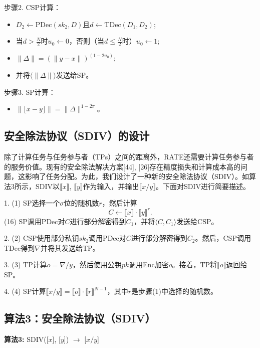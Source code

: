 步骤2. CSP计算：

\begin{itemize}[leftmargin=*, nosep]
  \item \(D_{2}\leftarrow\text{PDec}(sk_{2},D)\)且\(d\leftarrow\text{TDec}(D_{1},D_{2})\);
  \item 当\(d>\frac{N}{2}\)时\(u_{0}\gets 0\)，否则（当\(d\leq\frac{N}{2}\)时）\(u_{0}\gets 1\);
  \item \(\|\Delta\|=(\|y-x\|)^{(1-2u_{0})}\);
  \item 并将\(\langle\|\Delta\|\rangle\)发送给SP。
\end{itemize}

步骤3. SP计算：

\begin{itemize}[leftmargin=*, nosep]
  \item \(\|\lfloor x-y\rfloor\|=\|\Delta\|^{1-2\pi}\)。
\end{itemize}


\subsection{安全除法协议（SDIV）的设计}

除了计算任务与任务参与者（TPs）之间的距离外，RATE还需要计算任务参与者的服务价值。现有的安全除法解决方案[44], [26]存在精度损失和计算成本高的问题，这影响了任务分配。为此，我们设计了一种新的安全除法协议（SDIV）。如算法3所示，SDIV以\(\llbracket x\rrbracket\), \(\llbracket y\rrbracket\)作为输入，并输出\(\llbracket x/y\rrbracket\)。下面对SDIV进行简要描述。

1. (1) SP选择一个\(\sigma\)位的随机数\(r\)，然后计算
   \[
   C\leftarrow\llbracket x\rrbracket\cdot\llbracket y\rrbracket^{r}.
   \]
   (16)
   SP调用PDec对\(C\)进行部分解密得到\(C_{1}\)，并将\(\langle C,C_{1}\rangle\)发送给CSP。

2. (2) CSP使用部分私钥\(sk_{2}\)调用PDec对\(C\)进行部分解密得到\(C_{2}\)。然后，CSP调用TDec得到\(\nabla\)并将其发送给TP。

3. (3) TP计算\(o=\nabla/y\)，然后使用公钥\(pk\)调用Enc加密\(o\)。接着，TP将\(\llbracket o\rrbracket\)返回给SP。

4. (4) SP计算\(\llbracket x/y\rrbracket=\llbracket o\rrbracket\cdot\llbracket r\rrbracket^{N-1}\)，其中\(r\)是步骤(1)中选择的随机数。

\subsection{算法3：安全除法协议（SDIV）}
\textbf{算法3:} SDIV([\(x\)], [\(y\)]) \(\rightarrow\) [\(x/y\)]

